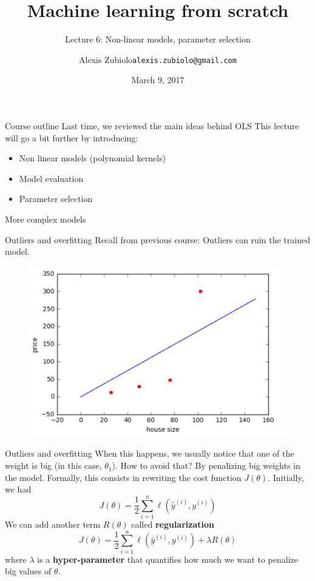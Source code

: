 \documentclass{beamer}
\title{Machine learning from scratch}
\subtitle{Lecture 6: Non-linear models, parameter selection}
\author{Alexis Zubiolo\newline\texttt{alexis.zubiolo@gmail.com}}
\institute{Data Science Team Lead @ Adcash}
\date{March 9, 2017}
\newcommand{\1}[1]{\mathbbm{1}\left[#1\right]}
\newcommand{\yi}{y^{(i)}}
\newcommand{\yhati}{\hat{y}^{(i)}}
\begin{document}
\begin{frame}
  \titlepage
\end{frame}

\begin{frame}{Course outline}
Last time, we reviewed the main ideas behind OLS
\vfill
\pause
This lecture will go a bit further by introducing:
\begin{itemize}
	\item Non linear models (polynomial kernels)
	\item Model evaluation
	\item Parameter selection
\end{itemize}
\end{frame}

\begin{frame}
	\center
	\huge{More complex models}
\end{frame}

\begin{frame}{Outliers and overfitting}
Recall from previous course: Outliers can ruin the trained model.
\pause
\vfill
\begin{figure}
\centering
\includegraphics[width=\linewidth]{images/line_regression_outlier.png}
\end{figure}
\end{frame}

\begin{frame}{Outliers and overfitting}
When this happens, we usually notice that one of the weight is big (in this case, $\theta_1$).
\pause
\vfill
How to avoid that? \pause By penalizing big weights in the model.
\pause
\vfill 
Formally, this consists in rewriting the cost function $J(\theta)$. Initially, we had 
\begin{equation*}
J(\theta) = \dfrac{1}{2} \sum_{i = 1}^{n} \ell \left( \yhati, \yi \right)
\end{equation*}
\pause
\vfill 
We can add another term $R(\theta)$ called \textbf{regularization}
\begin{equation*}
J(\theta) = \dfrac{1}{2} \sum_{i = 1}^{n} \ell \left( \yhati, \yi \right) + \lambda R(\theta)
\end{equation*}
\pause
\vfill
where $\lambda$ is a \textbf{hyper-parameter} that quantifies how much we want to penalize big values of $\theta$.
\end{frame}
\end{document}

